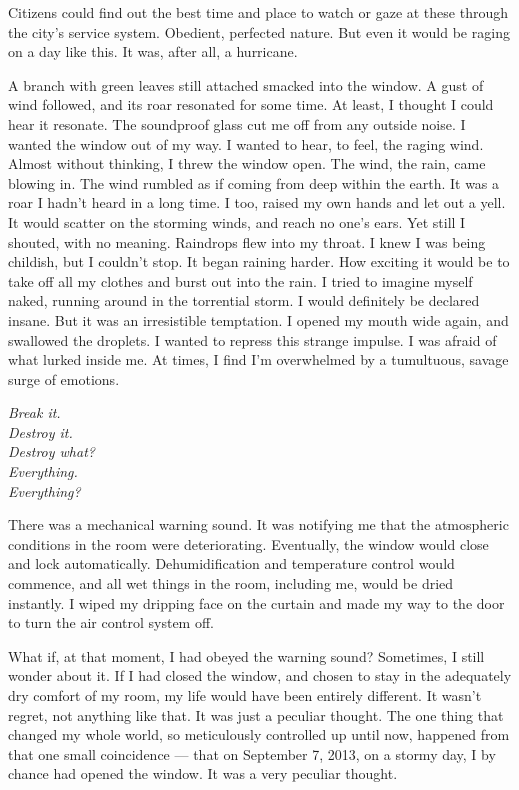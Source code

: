 Citizens could find out the best time and place to watch or gaze at
these through the city's service system. Obedient, perfected nature. But
even it would be raging on a day like this. It was, after all, a
hurricane.

A branch with green leaves still attached smacked into the window. A
gust of wind followed, and its roar resonated for some time. At least, I
thought I could hear it resonate. The soundproof glass cut me off from
any outside noise. I wanted the window out of my way. I wanted to hear,
to feel, the raging wind. Almost without thinking, I threw the window
open. The wind, the rain, came blowing in. The wind rumbled as if coming
from deep within the earth. It was a roar I hadn't heard in a long time.
I too, raised my own hands and let out a yell. It would scatter on the
storming winds, and reach no one's ears. Yet still I shouted, with no
meaning. Raindrops flew into my throat. I knew I was being childish, but
I couldn't stop. It began raining harder. How exciting it would be to
take off all my clothes and burst out into the rain. I tried to imagine
myself naked, running around in the torrential storm. I would definitely
be declared insane. But it was an irresistible temptation. I opened my
mouth wide again, and swallowed the droplets. I wanted to repress this
strange impulse. I was afraid of what lurked inside me. At times, I find
I'm overwhelmed by a tumultuous, savage surge of emotions.

\myspace

\emph{Break it.\\
	Destroy it.\\
	Destroy what?\\
	Everything.\\
	Everything?}

\myspace

There was a mechanical warning sound. It was notifying me that the
atmospheric conditions in the room were deteriorating. Eventually, the
window would close and lock automatically. Dehumidification and
temperature control would commence, and all wet things in the room,
including me, would be dried instantly. I wiped my dripping face on the
curtain and made my way to the door to turn the air control system off.

What if, at that moment, I had obeyed the warning sound? Sometimes, I
still wonder about it. If I had closed the window, and chosen to stay in
the adequately dry comfort of my room, my life would have been entirely
different. It wasn't regret, not anything like that. It was just a
peculiar thought. The one thing that changed my whole world, so
meticulously controlled up until now, happened from that one small
coincidence --- that on September 7, 2013, on a stormy day, I by chance
had opened the window. It was a very peculiar thought.

